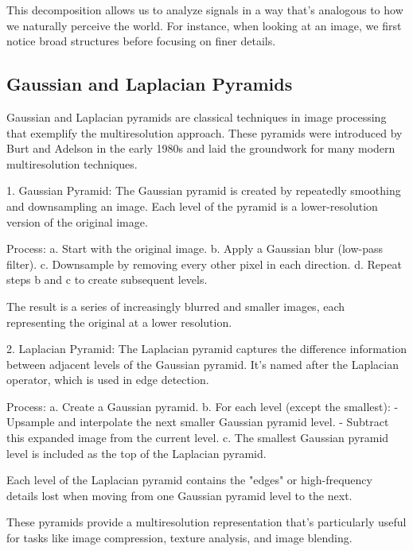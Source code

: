 

This decomposition allows us to analyze signals in a way that's analogous to how we naturally perceive the world. For instance, when looking at an image, we first notice broad structures before focusing on finer details.

\subsection{Gaussian and Laplacian Pyramids}

Gaussian and Laplacian pyramids are classical techniques in image processing that exemplify the multiresolution approach. These pyramids were introduced by Burt and Adelson in the early 1980s and laid the groundwork for many modern multiresolution techniques.

1. Gaussian Pyramid:
   The Gaussian pyramid is created by repeatedly smoothing and downsampling an image. Each level of the pyramid is a lower-resolution version of the original image.

   Process:
   a. Start with the original image.
   b. Apply a Gaussian blur (low-pass filter).
   c. Downsample by removing every other pixel in each direction.
   d. Repeat steps b and c to create subsequent levels.

   The result is a series of increasingly blurred and smaller images, each representing the original at a lower resolution.

2. Laplacian Pyramid:
   The Laplacian pyramid captures the difference information between adjacent levels of the Gaussian pyramid. It's named after the Laplacian operator, which is used in edge detection.

   Process:
   a. Create a Gaussian pyramid.
   b. For each level (except the smallest):
      - Upsample and interpolate the next smaller Gaussian pyramid level.
      - Subtract this expanded image from the current level.
   c. The smallest Gaussian pyramid level is included as the top of the Laplacian pyramid.

   Each level of the Laplacian pyramid contains the "edges" or high-frequency details lost when moving from one Gaussian pyramid level to the next.

These pyramids provide a multiresolution representation that's particularly useful for tasks like image compression, texture analysis, and image blending.

